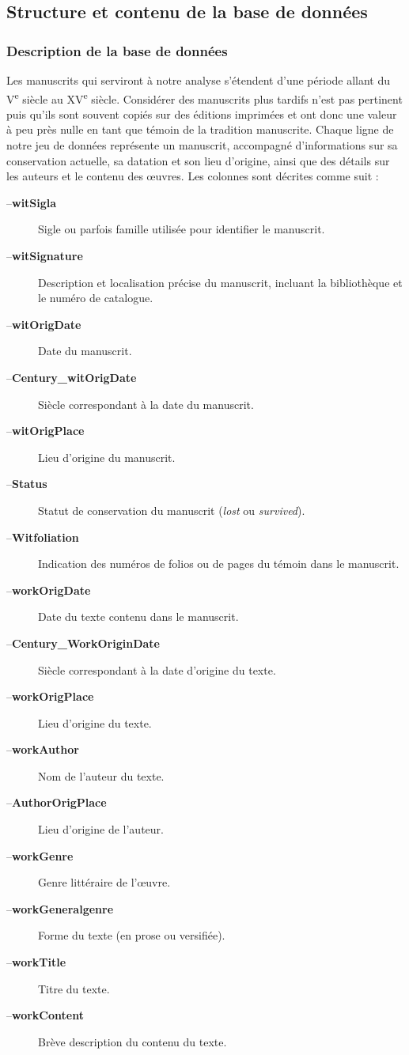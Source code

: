 \documentclass[a4paper,twoside,12pt]{book}
\begin{document}
\subsection{Structure et contenu de la base de données}

\subsubsection{Description de la base de données}
Les manuscrits qui serviront à notre analyse s’étendent d’une période allant du V\textsuperscript{e} siècle au  XV\textsuperscript{e} siècle. Considérer des manuscrits plus tardifs n’est pas pertinent puis qu’ils sont souvent copiés sur des éditions imprimées et ont donc une valeur à peu près nulle en tant que témoin de la tradition manuscrite. Chaque ligne de notre jeu de données représente un manuscrit, accompagné d’informations sur sa conservation actuelle, sa datation et son lieu d’origine, ainsi que des détails sur les auteurs et le contenu des œuvres. Les colonnes  sont décrites comme suit :

\begin{description}
	\item[--\textbf{witSigla}] Sigle ou parfois famille utilisée pour identifier le manuscrit.
	\item[--\textbf{witSignature}] Description et localisation précise du manuscrit, incluant la bibliothèque et le numéro de catalogue.
	\item[--\textbf{witOrigDate}] Date du manuscrit.
	\item[--\textbf{Century\_witOrigDate}] Siècle correspondant à la date du manuscrit.
	\item[--\textbf{witOrigPlace}] Lieu d’origine du manuscrit.
	\item[--\textbf{Status}] Statut de conservation du manuscrit (\textit{lost} ou \textit{survived}).
	\item[--\textbf{Witfoliation}] Indication des numéros de folios ou de pages du témoin dans le manuscrit.
	\item[--\textbf{workOrigDate}] Date du texte contenu dans le manuscrit.
	\item[--\textbf{Century\_WorkOriginDate}] Siècle correspondant à la date d’origine du texte.
	\item[--\textbf{workOrigPlace}] Lieu d’origine du texte.
	\item[--\textbf{workAuthor}] Nom de l’auteur du texte.
	\item[--\textbf{AuthorOrigPlace}] Lieu d’origine de l’auteur.
	\item[--\textbf{workGenre}] Genre littéraire de l’œuvre.
	\item[--\textbf{workGeneralgenre}] Forme du texte (en prose ou versifiée).
	\item[--\textbf{workTitle}] Titre du texte.
	\item[--\textbf{workContent}] Brève description du contenu du texte.
\end{description}
\end{document}
